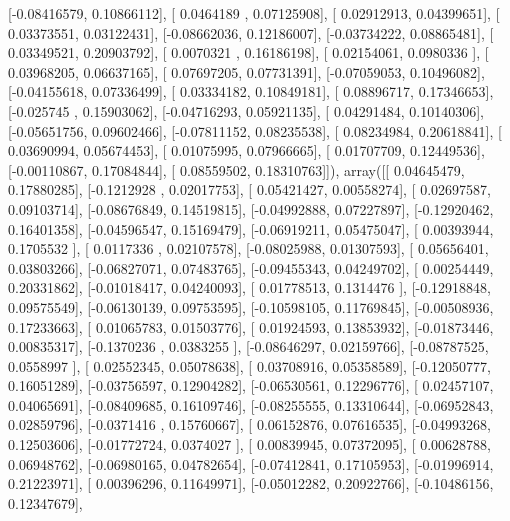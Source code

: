 \documentclass{article}
\begin{document}
       [-0.08416579,  0.10866112],
       [ 0.0464189 ,  0.07125908],
       [ 0.02912913,  0.04399651],
       [ 0.03373551,  0.03122431],
       [-0.08662036,  0.12186007],
       [-0.03734222,  0.08865481],
       [ 0.03349521,  0.20903792],
       [ 0.0070321 ,  0.16186198],
       [ 0.02154061,  0.0980336 ],
       [ 0.03968205,  0.06637165],
       [ 0.07697205,  0.07731391],
       [-0.07059053,  0.10496082],
       [-0.04155618,  0.07336499],
       [ 0.03334182,  0.10849181],
       [ 0.08896717,  0.17346653],
       [-0.025745  ,  0.15903062],
       [-0.04716293,  0.05921135],
       [ 0.04291484,  0.10140306],
       [-0.05651756,  0.09602466],
       [-0.07811152,  0.08235538],
       [ 0.08234984,  0.20618841],
       [ 0.03690994,  0.05674453],
       [ 0.01075995,  0.07966665],
       [ 0.01707709,  0.12449536],
       [-0.00110867,  0.17084844],
       [ 0.08559502,  0.18310763]]), array([[ 0.04645479,  0.17880285],
       [-0.1212928 ,  0.02017753],
       [ 0.05421427,  0.00558274],
       [ 0.02697587,  0.09103714],
       [-0.08676849,  0.14519815],
       [-0.04992888,  0.07227897],
       [-0.12920462,  0.16401358],
       [-0.04596547,  0.15169479],
       [-0.06919211,  0.05475047],
       [ 0.00393944,  0.1705532 ],
       [ 0.0117336 ,  0.02107578],
       [-0.08025988,  0.01307593],
       [ 0.05656401,  0.03803266],
       [-0.06827071,  0.07483765],
       [-0.09455343,  0.04249702],
       [ 0.00254449,  0.20331862],
       [-0.01018417,  0.04240093],
       [ 0.01778513,  0.1314476 ],
       [-0.12918848,  0.09575549],
       [-0.06130139,  0.09753595],
       [-0.10598105,  0.11769845],
       [-0.00508936,  0.17233663],
       [ 0.01065783,  0.01503776],
       [ 0.01924593,  0.13853932],
       [-0.01873446,  0.00835317],
       [-0.1370236 ,  0.0383255 ],
       [-0.08646297,  0.02159766],
       [-0.08787525,  0.0558997 ],
       [ 0.02552345,  0.05078638],
       [ 0.03708916,  0.05358589],
       [-0.12050777,  0.16051289],
       [-0.03756597,  0.12904282],
       [-0.06530561,  0.12296776],
       [ 0.02457107,  0.04065691],
       [-0.08409685,  0.16109746],
       [-0.08255555,  0.13310644],
       [-0.06952843,  0.02859796],
       [-0.0371416 ,  0.15760667],
       [ 0.06152876,  0.07616535],
       [-0.04993268,  0.12503606],
       [-0.01772724,  0.0374027 ],
       [ 0.00839945,  0.07372095],
       [ 0.00628788,  0.06948762],
       [-0.06980165,  0.04782654],
       [-0.07412841,  0.17105953],
       [-0.01996914,  0.21223971],
       [ 0.00396296,  0.11649971],
       [-0.05012282,  0.20922766],
       [-0.10486156,  0.12347679],
\end{document}
